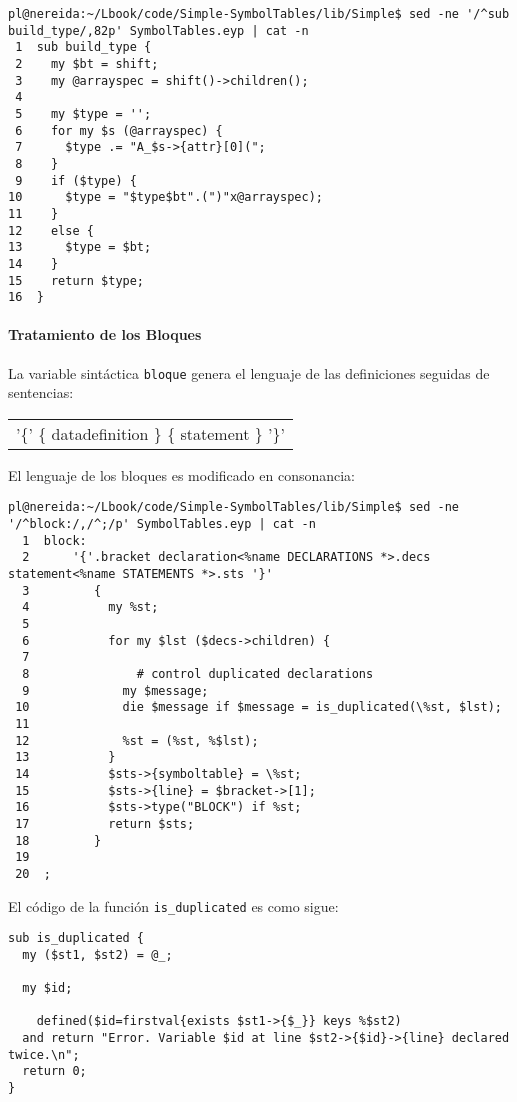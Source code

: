 \begin{verbatim}
pl@nereida:~/Lbook/code/Simple-SymbolTables/lib/Simple$ sed -ne '/^sub build_type/,82p' SymbolTables.eyp | cat -n
 1  sub build_type {
 2    my $bt = shift;
 3    my @arrayspec = shift()->children();
 4
 5    my $type = '';
 6    for my $s (@arrayspec) {
 7      $type .= "A_$s->{attr}[0](";
 8    }
 9    if ($type) {
10      $type = "$type$bt".(")"x@arrayspec);
11    }
12    else {
13      $type = $bt;
14    }
15    return $type;
16  }
\end{verbatim}

\paragraph{Tratamiento de los Bloques}
La variable sintáctica \verb|bloque|
genera el lenguaje de las definiciones seguidas de sentencias:

\begin{center}
\begin{tabular}{c}
      '\{' \{ datadefinition \} \{ statement \} '\}'
\end{tabular}
\end{center}

El lenguaje de los bloques es modificado en consonancia:

\begin{verbatim}
pl@nereida:~/Lbook/code/Simple-SymbolTables/lib/Simple$ sed -ne '/^block:/,/^;/p' SymbolTables.eyp | cat -n
  1  block:
  2      '{'.bracket declaration<%name DECLARATIONS *>.decs statement<%name STATEMENTS *>.sts '}'
  3         {
  4           my %st;
  5
  6           for my $lst ($decs->children) {
  7
  8               # control duplicated declarations
  9             my $message;
 10             die $message if $message = is_duplicated(\%st, $lst);
 11
 12             %st = (%st, %$lst);
 13           }
 14           $sts->{symboltable} = \%st;
 15           $sts->{line} = $bracket->[1];
 16           $sts->type("BLOCK") if %st;
 17           return $sts;
 18         }
 19
 20  ;
\end{verbatim}

El código de la función \verb|is_duplicated| es como sigue:
\label{code:isduplicated}

\begin{verbatim}
sub is_duplicated {
  my ($st1, $st2) = @_;

  my $id;

    defined($id=firstval{exists $st1->{$_}} keys %$st2)
  and return "Error. Variable $id at line $st2->{$id}->{line} declared twice.\n";
  return 0;
}
\end{verbatim}

